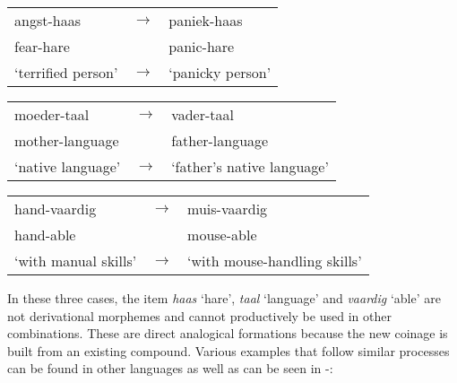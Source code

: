 
\begin{exe}
    \ex \label{exe-dutch-analogies}
    \begin{xlist}
        \ex
        \begin{tabular}[t]{lcl}
          angst-haas           & $\rightarrow$ & paniek-haas                  \\
          fear-hare            &               & panic-hare                   \\
          `terrified person'   & $\rightarrow$ & `panicky person'             \\
        \end{tabular}
        \ex
        \begin{tabular}[t]{lcl}
          moeder-taal          & $\rightarrow$ & vader-taal                   \\
          mother-language      &               & father-language              \\
          `native language'    & $\rightarrow$ & `father's native language'  \\
        \end{tabular}
        \ex
        \begin{tabular}[t]{lcl}
          hand-vaardig         & $\rightarrow$ & muis-vaardig                 \\
          hand-able            &               & mouse-able                   \\
          `with manual skills' & $\rightarrow$ & `with mouse-handling skills' \\
        \end{tabular}
    \end{xlist}
\end{exe}


In these three cases, the item \textit{haas} `hare', \textit{taal} `language' and \textit{vaardig} `able' are not derivational morphemes and cannot productively be used in other combinations. These are direct analogical formations because the new coinage is built from an existing compound. Various examples that follow similar processes can be found in other languages as well as can be seen in -:


